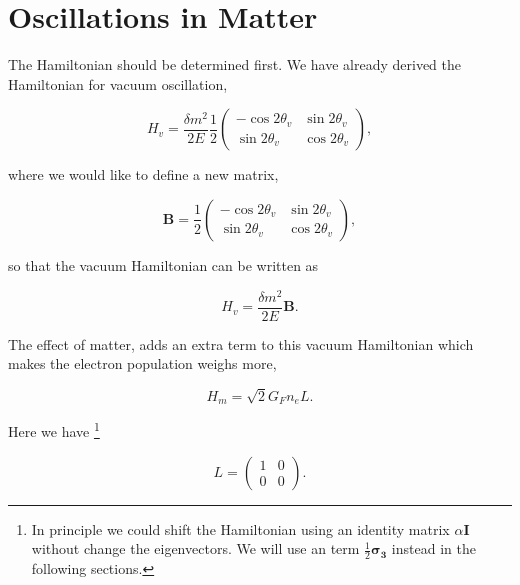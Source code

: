\documentclass{tufte-handout}
\begin{document}

\section{Oscillations in Matter}


The Hamiltonian should be determined first. We have already derived the Hamiltonian for vacuum oscillation,

\begin{equation*}
H_v=\frac{ \delta m^2 }{2E}\frac{1}{2}\begin{pmatrix} -\cos 2\theta_v & \sin 2 \theta_v \\ \sin 2\theta_v & \cos 2\theta_v  \end{pmatrix},
\end{equation*}


where we would like to define a new matrix,

\begin{equation*}
\mathbf B = \frac{1}{2}\begin{pmatrix}  -\cos 2\theta_v & \sin 2 \theta_v \\ \sin 2\theta_v & \cos 2\theta_v  \end{pmatrix},
\end{equation*}


so that the vacuum Hamiltonian can be written as

\begin{equation*}
H_v = \frac{ \delta m^2 }{2E}\mathbf B.
\end{equation*}

The effect of matter, adds an extra term to this vacuum Hamiltonian which makes the electron population weighs more,

\begin{equation*}
H_m = \sqrt{2}G_F n_e L.
\end{equation*}

Here we have \footnote{In principle we could shift the Hamiltonian using an identity matrix $\alpha \mathbf{I}$ without change the eigenvectors. We will use an term $\frac{1}{2}\mathbf{\sigma_3} $ instead in the following sections.}

\begin{equation*}
L = \begin{pmatrix} 1 & 0 \\ 0 & 0 \end{pmatrix}.
\end{equation*}
\end{document}
